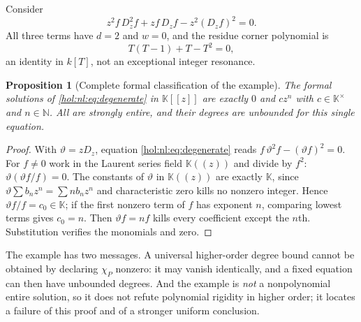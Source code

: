 \documentclass[11pt]{article}
\numberwithin{equation}{section}
\newtheorem{proposition}[theorem]{Proposition}
\theoremstyle{definition}
\theoremstyle{remark}
\newcommand{\N}{\mathbb N}
\newcommand{\KK}{\mathbb K}
\begin{document}
Consider
\begin{equation}\label{hol:nl:eq:degenerate}
 z^2f\,D_z^2f+zf\,D_zf-z^2(D_zf)^2=0.
\end{equation}
All three terms have $d=2$ and $w=0$, and the residue corner polynomial is
\begin{equation}\label{hol:nl:eq:degeneratechi}
 T(T-1)+T-T^2=0,
\end{equation}
an identity in $k[T]$, not an exceptional integer resonance.

\begin{proposition}[Complete formal classification of the example]
\label{hol:nl:prop:degenerate}
The formal solutions of \eqref{hol:nl:eq:degenerate} in $\KK[[z]]$ are exactly
$0$ and $cz^n$ with $c\in\KK^\times$ and $n\in\N$. All are strongly entire,
and their degrees are unbounded for this single equation.
\end{proposition}

\begin{proof}
With $\vartheta=zD_z$, equation \eqref{hol:nl:eq:degenerate} reads
$f\,\vartheta^2f-(\vartheta f)^2=0$. For $f\ne0$ work in the Laurent series
field $\KK((z))$ and divide by $f^2$: $\vartheta(\vartheta f/f)=0$. The
constants of $\vartheta$ in $\KK((z))$ are exactly $\KK$, since
$\vartheta\sum b_nz^n=\sum nb_nz^n$ and characteristic zero kills no nonzero
integer. Hence $\vartheta f/f=c_0\in\KK$; if the first nonzero term of $f$
has exponent $n$, comparing lowest terms gives $c_0=n$. Then $\vartheta f=nf$
kills every coefficient except the $n$th. Substitution verifies the monomials
and zero.
\end{proof}

The example has two messages. A universal higher-order degree bound cannot
be obtained by declaring $\chi_P$ nonzero: it may vanish identically, and a
fixed equation can then have unbounded degrees. And the example is \emph{not}
a nonpolynomial entire solution, so it does not refute polynomial rigidity in
higher order; it locates a failure of this proof and of a stronger uniform
conclusion.
\end{document}
